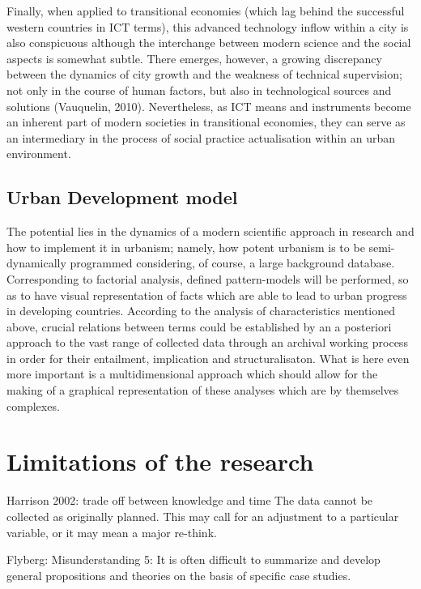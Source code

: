 \documentclass[11pt]{report}
\begin{document}
Finally, when applied to transitional economies (which lag behind the successful western countries in ICT terms), this advanced technology inflow within a city is also conspicuous although the interchange between modern science and the social aspects is somewhat subtle. There emerges, however, a growing discrepancy between the dynamics of city growth and the weakness of technical supervision; not only in the course of human factors, but also in technological sources and solutions (Vauquelin, 2010). Nevertheless, as ICT means and instruments become an inherent part of modern societies in transitional economies, they can serve as an intermediary in the process of social practice actualisation within an urban environment.

\subsection{Urban Development model}

The potential lies in the dynamics of a modern scientific approach in research and how to implement it in urbanism; namely, how potent urbanism is to be semi-dynamically programmed considering, of course, a large background database. 
Corresponding to factorial analysis, defined pattern-models will be performed, so as to have visual representation of facts which are able to lead to urban progress in developing countries.
According to the analysis of characteristics mentioned above, crucial relations between terms could be established by an a posteriori approach to the vast range of collected data through an archival working process in order for their entailment, implication and structuralisaton.
What is here even more important is a multidimensional approach which should allow for the making of a graphical representation of these analyses which are by themselves complexes.

\section{Limitations of the research}

Harrison 2002:
trade off between knowledge and time
The data cannot be collected as originally planned. This may call for an
adjustment to a particular variable, or it may mean a major re-think.

Flyberg:
Misunderstanding 5: It is often difficult to summarize and develop general propositions and theories on the basis of specific case studies.
\end{document}
